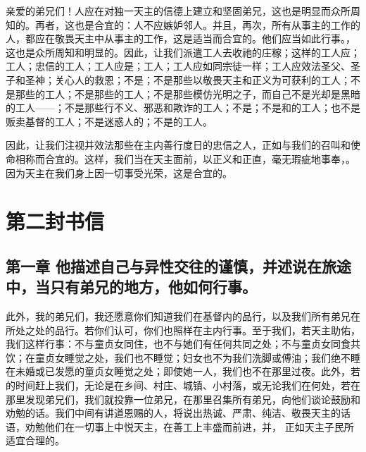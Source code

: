 亲爱的弟兄们！人应在对独一天主的信德上建立和坚固弟兄，这也是明显而众所周知的。再者，这也是合宜的：人不应嫉妒邻人。并且，再次，所有从事主的工作的人，都应在敬畏天主中从事主的工作，这是适当而合宜的。他们应当如此行事。，这也是众所周知和明显的。因此，让我们派遣工人去收祂的庄稼；这样的工人应；工人；忠信的工人；工人应是；工人；工人应如同宗徒一样；工人应效法圣父、圣子和圣神；关心人的救恩；不是；不是那些以敬畏天主和正义为可获利的工人；不是那些的工人；不是那些的工人；不是那些模仿光明之子，而自己不是光却是黑暗的工人——；不是那些行不义、邪恶和欺诈的工人；不是；不是和的工人；也不是贩卖基督的工人；不是迷惑人的；不是的工人。\par

因此，让我们注视并效法那些在主内善行度日的忠信之人，正如与我们的召叫和使命相称而合宜的。这样，我们当在天主面前，以正义和正直，毫无瑕疵地事奉，。因为天主在我们身上因一切事受光荣，这是合宜的。\par


\section{第二封书信}


\subsection{第一章 他描述自己与异性交往的谨慎，并述说在旅途中，当只有弟兄的地方，他如何行事。}

此外，我的弟兄们，我还愿意你们知道我们在基督内的品行，以及我们所有弟兄在所处之处的品行。若你们认可，你们也照样在主内行事。至于我们，若天主助佑，我们这样行事：不与童贞女同住，也不与她们有任何共同之处；不与童贞女同食共饮；在童贞女睡觉之处，我们也不睡觉；妇女也不为我们洗脚或傅油；我们绝不睡在未婚或已发愿的童贞女睡觉之处；即使她一人，我们也不在那里过夜。此外，若的时间赶上我们，无论是在乡间、村庄、城镇、小村落，或无论我们在何处，若在那里发现弟兄们，我们就投靠一位弟兄，在那里召集所有弟兄，向他们谈论鼓励和劝勉的话。我们中间有讲道恩赐的人，将说出热诚、严肃、纯洁、敬畏天主的话语，劝勉他们在一切事上中悦天主，在善工上丰盛而前进，并， 正如天主子民所适宜合理的。\par

